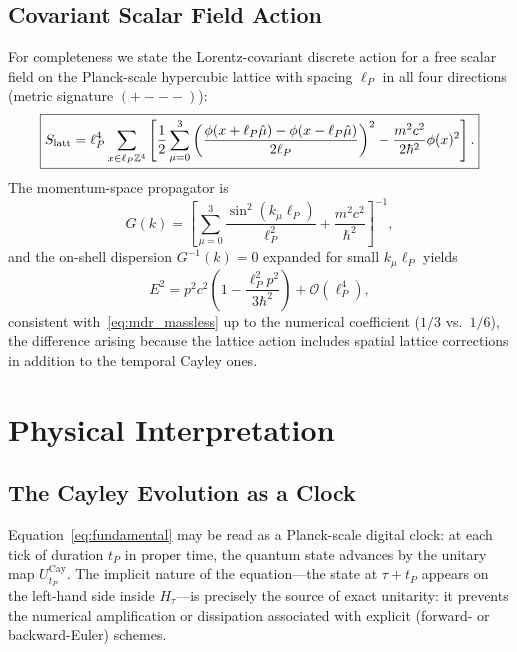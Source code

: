 \documentclass[12pt,a4paper]{article}
\begin{document}
\subsection{Covariant Scalar Field Action}
\label{sec:scalar_action}

For completeness we state the Lorentz-covariant discrete action for a free scalar field
on the Planck-scale hypercubic lattice with spacing $\ell_P$ in all four directions
(metric signature $(+{-}{-}{-})$):
\begin{equation}
  \boxed{%
  S_{\mathrm{latt}} = \ell_P^4 \sum_{x \in \ell_P\mathbb{Z}^4}
  \left[
    \frac{1}{2}\sum_{\mu=0}^{3}\left(\frac{\phi(x+\ell_P\hat{\mu}) - \phi(x-\ell_P\hat{\mu})}{2\ell_P}\right)^2
    - \frac{m^2 c^2}{2\hbar^2}\phi(x)^2
  \right].
  }
  \label{eq:lattice_action}
\end{equation}
The momentum-space propagator is
\begin{equation}
  G(k) = \left[\sum_{\mu=0}^{3}\frac{\sin^2(k_\mu \ell_P)}{\ell_P^2} + \frac{m^2 c^2}{\hbar^2}\right]^{-1},
  \label{eq:lattice_propagator}
\end{equation}
and the on-shell dispersion $G^{-1}(k)=0$ expanded for small $k_\mu \ell_P$ yields
\begin{equation}
  E^2 = p^2 c^2\!\left(1 - \frac{\ell_P^2 p^2}{3\hbar^2}\right) + \mathcal{O}(\ell_P^4),
  \label{eq:lattice_mdr}
\end{equation}
consistent with~\eqref{eq:mdr_massless} up to the numerical coefficient ($1/3$ vs.\ $1/6$),
the difference arising because the lattice action includes spatial lattice corrections in
addition to the temporal Cayley ones.

\section{Physical Interpretation}
\label{sec:physical}

\subsection{The Cayley Evolution as a Clock}

Equation~\eqref{eq:fundamental} may be read as a Planck-scale digital clock: at each
tick of duration $t_P$ in proper time, the quantum state advances by the unitary map
$U_{t_P}^{\mathrm{Cay}}$.  The implicit nature of the equation---the state at
$\tau + t_P$ appears on the left-hand side inside $H_\tau$---is precisely the source of
exact unitarity: it prevents the numerical amplification or dissipation associated with
explicit (forward- or backward-Euler) schemes.
\end{document}
